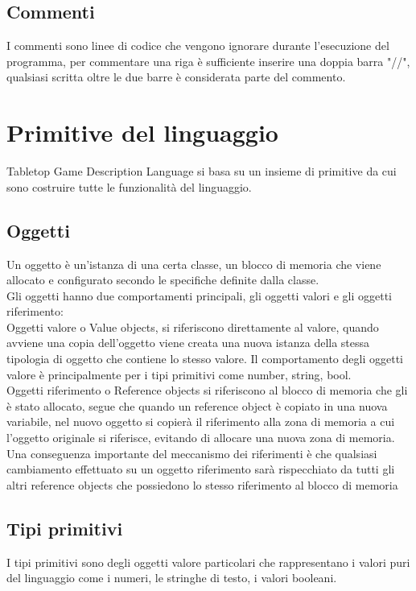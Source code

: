 \subsection{Commenti}
I commenti sono linee di codice che vengono ignorare durante l'esecuzione del programma, 
per commentare una riga è sufficiente inserire una doppia barra "//", qualsiasi scritta oltre 
le due barre è considerata parte del commento.

\section{Primitive del linguaggio}
Tabletop Game Description Language si basa su un insieme di primitive da cui sono costruire tutte 
le funzionalità del linguaggio.
 
\subsection{Oggetti}
Un oggetto è un'istanza di una certa classe, un blocco di memoria che viene allocato e configurato secondo
le specifiche definite dalla classe. \\
Gli oggetti hanno due comportamenti principali, gli oggetti valori e gli oggetti riferimento:
\\
Oggetti valore o Value objects, si riferiscono direttamente al valore, quando avviene una copia dell'oggetto
viene creata una nuova istanza della stessa tipologia di oggetto che contiene lo stesso valore.
Il comportamento degli oggetti valore è principalmente per i tipi primitivi come number, string, bool.
\\
Oggetti riferimento o Reference objects si riferiscono al blocco di memoria che gli è stato allocato,
segue che quando un reference object è copiato in una nuova variabile, nel nuovo oggetto si copierà 
il riferimento alla zona di memoria a cui l'oggetto originale si riferisce, evitando di allocare una
nuova zona di memoria. 
\\
Una conseguenza importante del meccanismo dei riferimenti è che qualsiasi cambiamento effettuato su un
oggetto riferimento sarà rispecchiato da tutti gli altri reference objects che possiedono lo stesso riferimento
al blocco di memoria

\newpage
\subsection{Tipi primitivi}
I tipi primitivi sono degli oggetti valore particolari che rappresentano i valori puri del linguaggio come
i numeri, le stringhe di testo, i valori booleani.

